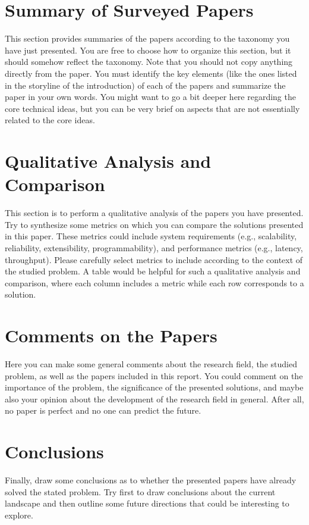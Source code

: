 \documentclass{upb-cn}
\begin{document}
\section{Summary of Surveyed Papers}
\label{sec:papers}

This section provides summaries of the papers according to the taxonomy you have just presented. You are free to choose how to organize this section, but it should somehow reflect the taxonomy. Note that you should not copy anything directly from the paper. You must identify the key elements (like the ones listed in the storyline of the introduction) of each of the papers and summarize the paper in your own words. You might want to go a bit deeper here regarding the core technical ideas, but you can be very brief on aspects that are not essentially related to the core ideas.

\section{Qualitative Analysis and Comparison}
\label{sec:analysis}

This section is to perform a qualitative analysis of the papers you have presented. Try to synthesize some metrics on which you can compare the solutions presented in this paper. These metrics could include system requirements (e.g., scalability, reliability, extensibility, programmability), and performance metrics (e.g., latency, throughput). Please carefully select metrics to include according to the context of the studied problem. A table would be helpful for such a qualitative analysis and comparison, where each column includes a metric while each row corresponds to a solution.

\section{Comments on the Papers}
\label{sec:comments}

Here you can make some general comments about the research field, the studied problem, as well as the papers included in this report. You could comment on the importance of the problem, the significance of the presented solutions, and maybe also your opinion about the development of the research field in general. After all, no paper is perfect and no one can predict the future.

\section{Conclusions}
\label{sec:conclusions}

Finally, draw some conclusions as to whether the presented papers have already solved the stated problem. Try first to draw conclusions about the current landscape and then outline some future directions that could be interesting to explore.

\printbibliography
\end{document}
